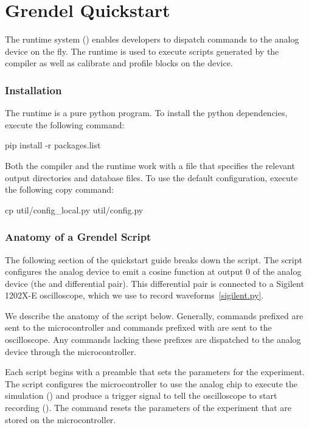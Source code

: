 \chapter{Grendel Quickstart}

The \grendel runtime system () enables developers to dispatch
commands to the \hcdc analog device on the fly. The \grendel runtime is used to
execute scripts generated by the \legno compiler as well as calibrate and profile
blocks on the device. 

\subsection{Installation}

The \grendel runtime is a pure python program. To install the python
dependencies, execute the following command:

\begin{snippet}
  pip install -r packages.list
\end{snippet}

Both the \legno compiler and the \grendel runtime work with a 
file that specifies the relevant output directories and database files. To use
the default configuration, execute the following copy command:

\begin{snippet}
cp util/config_local.py util/config.py
\end{snippet}

\subsection{Anatomy of a Grendel Script}

The following section of the quickstart guide breaks down the 
 script. The 
script configures the analog device to emit a
cosine function at output 0 of the analog device (the  and 
differential pair). This differential pair is connected to a Sigilent 1202X-E
oscilloscope, which we use to record waveforms~\ref{sigilent.py}.

We describe the anatomy of the \grendel script below. Generally, commands
prefixed  are sent to the microcontroller and commands prefixed with
 are sent to the oscilloscope. Any commands lacking these prefixes are
dispatched to the analog device through the microcontroller.


Each \grendel script begins with a preamble that sets the parameters for the
experiment. The  script configures the microcontroller to use the
analog chip to execute the simulation () and produce a
trigger signal to tell the oscilloscope to start recording (). The 
command resets the parameters of the experiment that are stored on the
microcontroller.

